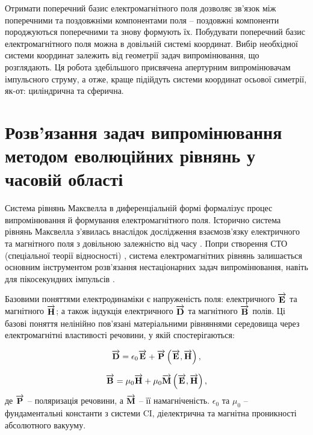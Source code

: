 Отримати поперечний базис електромагнітного поля дозволяє зв'язок між 
поперечними та поздовжніми компонентами поля -- поздовжні компоненти 
породжуються поперечними та знову формують їх. 
Побудувати поперечний базис електромагнітного поля можна в довільній системі 
координат. Вибір необхідної системи координат залежить від геометрії задач 
випромінювання, що розглядають. Ця робота здебільшого присвячена 
апертурним випромінювачам імпульсного струму, а отже, краще підійдуть 
системи координат осьової симетрії, як-от: циліндрична та сферична.

\section{Розв'язання задач випромінювання методом еволюційних рівнянь
у часовій області}

Система рівнянь Максвелла в диференціальній формі формалізує процес
випромінювання й формування електромагнітного поля. Історично система рівнянь 
Максвелла з'явилась внаслідок дослідження взаємозв'язку електричного та 
магнітного поля з довільною залежністю від часу \cite{imp:Maxwell1865}.
Попри створення СТО (спеціальної теорії відносності) 
\cite{imp:Einstein1905}, система електромагнітних рівнянь залишається основним
інструментом розв'язання нестаціонарних задач випромінювання, навіть для 
пікосекундних імпульсів \cite{imp:Bray2006}.

Базовими поняттями електродинаміки є напруженість поля: електричного 
$ \overrightarrow{\mathbf E} $ та магнітного $ \overrightarrow{\mathbf H} $; а також індукція електричного 
$ \overrightarrow{\mathbf D} $ та магнітного $ \overrightarrow{\mathbf B} $ полів. Ці базові поняття нелінійно 
пов'язані матеріальними рівняннями середовища через електромагнітні 
властивості речовини, у якій спостерігаються:

\begin{equation} \label{eq:MInduct}
\overrightarrow{\mathbf D} = \epsilon_0 \overrightarrow{\mathbf E} + \overrightarrow{\mathbf P} \left( \overrightarrow{\mathbf E},\overrightarrow{\mathbf H} \right),
\end{equation}

\begin{equation} \label{eq:EInduct} 
\overrightarrow{\mathbf B} = \mu_0 \overrightarrow{\mathbf H} + \mu_0 \overrightarrow{\mathbf M} \left( \overrightarrow{\mathbf E},\overrightarrow{\mathbf H} \right),
\end{equation}
%
де $ \overrightarrow{\mathbf P} $ -- поляризація речовини, а $ \overrightarrow{\mathbf M} $ -- її намагніченість.
$ \epsilon_0 $ та $ \mu_0 $ -- фундаментальні константи з системи CI, 
діелектрична та магнітна проникності абсолютного вакууму.

